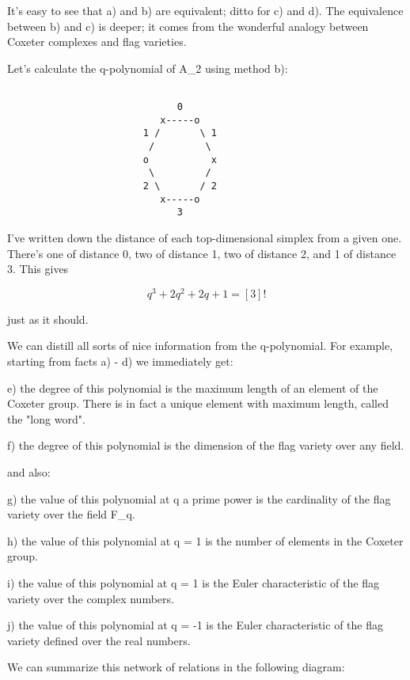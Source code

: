 It's easy to see that a) and b) are equivalent; ditto for c) and d).
The equivalence between b) and c) is deeper; it comes from the 
wonderful analogy between Coxeter complexes and flag varieties.  

Let's calculate the q-polynomial of A_{2} using method b):
                

\begin{verbatim}

                              0
                           x-----o
                        1 /       \ 1
                         /         \
                        o           x
                         \         /
                        2 \       / 2
                           x-----o
                              3
\end{verbatim}
    
I've written down the distance of each top-dimensional simplex
from a given one.  There's one of distance 0, two of distance 1,
two of distance 2, and 1 of distance 3.  This gives


$$

q^{3} + 2q^{2} + 2q + 1 =  [3]!
$$
    
just as it should.

We can distill all sorts of nice information from the q-polynomial.
For example, starting from facts a) - d) we immediately get:

e) the degree of this polynomial is the maximum length of an element
of the Coxeter group.  There is in fact a unique element with maximum
length, called the "long word".

f) the degree of this polynomial is the dimension of the flag variety
over any field. 

and also:

g) the value of this polynomial at q a prime power is the cardinality
of the flag variety over the field F_{q}.

h) the value of this polynomial at q = 1 is the number of elements
in the Coxeter group.

i) the value of this polynomial at q = 1 is the Euler characteristic
of the flag variety over the complex numbers.

j) the value of this polynomial at q = -1 is the Euler characteristic
of the flag variety defined over the real numbers.

We can summarize this network of relations in the following diagram:



$$

